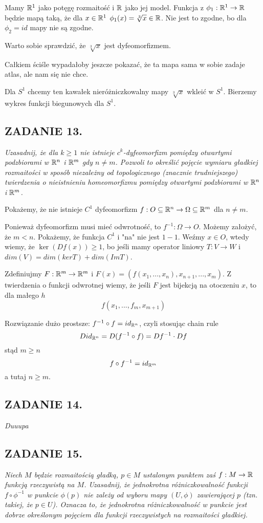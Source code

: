 Mamy $\mathbb{R}^1$ jako potęgę rozmaitość i $\mathbb{R}$ jako jej model. Funkcja z $\phi_1:\mathbb{R}^1\to\mathbb{R}$ będzie mapą taką, że dla $x\in\mathbb{R}^1$ $\phi_1(x)=\sqrt[3]{x}\in\mathbb{R}$. Nie jest to zgodne, bo dla $\phi_2=id$ mapy nie są zgodne.

Warto sobie sprawdzić, że $\sqrt[3]{x}$ jest dyfeomorfizmem.

Całkiem ściśle wypadałoby jeszcze pokazać, że ta mapa sama w sobie zadaje atlas, ale nam się nie chce.

Dla $S^1$ chcemy ten kawałek nieróżniczkowalny mapy $\sqrt[3]{x}$ wkleić w $S^1$. Bierzemy wykres funkcji biegunowych dla $S^1$.

\subsection*{ZADANIE 13.}
\emph{\color{pink}Uzasadnij, że dla $k\geq1$ nie istnieje $c^k$-dyfeomorfizm pomiędzy otwartymi podzbiorami w $\mathbb{R}^n$ i $\mathbb{R}^m$ gdy $n\neq m$. Pozwoli to określić pojęcie wymiaru gładkiej rozmaitości w sposób niezależny od topologicznego (znacznie trudniejszego) twierdzenia o nieistnieniu homeomorfizmu pomiędzy otwartymi podzbiorami w $\mathbb{R}^n$ i $\mathbb{R}^m$.}

Pokażemy, że nie istnieje $C^1$ dyfeomorfizm $f:O\subseteq\mathbb{R}^n\to\Omega\subseteq\mathbb{R}^m$ dla $n\neq m$.

Ponieważ dyfeomorfizm musi mieć odwrotność, to $f^{-1}:\Omega\to O$. Możemy założyć, że $m<n$. Pokażemy, że funkcja $C^1$ i "na" nie jest $1-1$. Weźmy $x\in O$, wtedy wiemy, że $\ker(Df(x))\geq1$, bo jeśli mamy operator liniowy $T:V\to W$ i $dim(V)=dim(ker T)+dim(Im T)$.

Zdefiniujmy $F:\mathbb{R}^m\to\mathbb{R}^m$ i $F(x)=(f(x_1,...,x_n), x_{n+1},...,x_{m})$. Z twierdzenia o funkcji odwrotnej wiemy, że jeśli $F$ jest bijekcją na otoczeniu $x$, to dla małego $h$
$$f(x_1,...,f_m,x_{m+1})$$

Rozwiązanie dużo prostsze: $f^{-1}\circ f=id_{\mathbb{R}^n}$, czyli stosując chain rule
$$Did_{\mathbb{R}^n}=D(f^{-1}\circ f)=Df^{-1}\cdot Df$$
stąd $m\geq n$
$$f\circ f^{-1}=id_{\mathbb{R}^m}$$
a tutaj $n\geq m$.

\subsection*{ZADANIE 14.}
\emph{\color{yellow}Duuupa}

\subsection*{ZADANIE 15.}
\emph{\color{yellow}Niech $M$ będzie rozmaitością gładką, $p\in M$ ustalonym punktem zaś $f:M\to\mathbb{R}$ funkcją rzeczywistą na $M$. Uzasadnij, że jednokrotna różniczkowalność funkcji $f\circ\phi^{-1}$ w punkcie $\phi(p)$ nie zależy od wyboru mapy $(U, \phi)$ zawierającej $p$ (tzn. takiej, że $p\in U$). Oznacza to, że jednokrotna różniczkowalność w punkcie jest dobrze określonym pojęciem dla funkcji rzeczywistych na rozmaitości gładkiej.}

